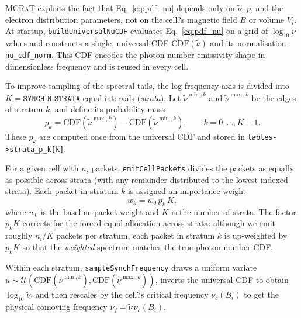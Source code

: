 \documentclass[12pt,a4paper]{article}
\newcommand{\nuth}{\tilde{\nu}}
\newcommand{\nuf}{\nu_{\!f}}
\newcommand{\nuc}{\nu_c}
\newcommand{\code}[1]{\texttt{#1}}
\newcommand{\mcrat}{\textsc{MCRaT}}
\begin{document}
\mcrat{} exploits the fact that Eq.~\eqref{eq:pdf_nu} depends only on
\(\nuth\), \(p\), and the electron distribution parameters, not on the
cell?s magnetic field \(B\) or volume \(V_i\). At startup,
\texttt{buildUniversalNuCDF} evaluates Eq.~\eqref{eq:pdf_nu} on a grid
of \(\log_{10}\nuth\) values and constructs a single, universal CDF
\(\mathrm{CDF}(\nuth)\) and its normalisation \texttt{nu\_cdf\_norm}.
This CDF encodes the photon-number emissivity shape in
dimensionless frequency and is reused in every cell.

To improve sampling of the spectral tails, the log-frequency axis is
divided into \(K = \code{SYNCH\_N\_STRATA}\) equal intervals
(\emph{strata}). Let \(\nuth^{\min,k}\) and \(\nuth^{\max,k}\) be the
edges of stratum \(k\), and define its probability mass
\begin{equation}
	p_k
	= \mathrm{CDF}(\nuth^{\max,k}) - \mathrm{CDF}(\nuth^{\min,k}),
	\qquad k = 0,\ldots,K-1.
	\label{eq:pk}
\end{equation}
These \(p_k\) are computed once from the universal CDF and stored in
\texttt{tables->strata\_p\_k[k]}.

For a given cell with \(n_i\) packets, \texttt{emitCellPackets} divides
the packets as equally as possible across strata (with any remainder
distributed to the lowest-indexed strata). Each packet in stratum \(k\)
is assigned an importance weight
\begin{equation}
	w_k = w_0\,p_k\,K,
	\label{eq:wk}
\end{equation}
where \(w_0\) is the baseline packet weight and \(K\) is the number of
strata. The factor \(p_k K\) corrects for the forced equal allocation
across strata: although we emit roughly \(n_i/K\) packets per stratum,
each packet in stratum \(k\) is up-weighted by \(p_k K\) so that the
\emph{weighted} spectrum matches the true photon-number CDF.

Within each stratum, \texttt{sampleSynchFrequency} draws a uniform
variate
\(u \sim \mathcal{U}(\mathrm{CDF}(\nuth^{\min,k}),\mathrm{CDF}(\nuth^{\max,k}))\),
inverts the universal CDF to obtain \(\log_{10}\nuth\), and then
rescales by the cell?s critical frequency \(\nuc(B_i)\) to get the
physical comoving frequency \(\nuf = \nuth\,\nuc(B_i)\).
\end{document}
